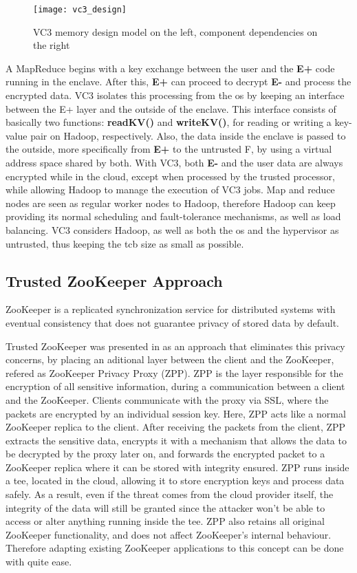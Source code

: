 \begin{figure}[tbp]
	\centering
	{\texttt{[image: vc3\_design]}}
	\caption{VC3 memory design model on the left, component dependencies on the right}
\end{figure}

A MapReduce begins with a key exchange between the user and the \textbf{E+} code running in the enclave. After this, \textbf{E+} can proceed to decrypt \textbf{E-} and process the encrypted data. VC3 isolates this processing from the \gls{os} by keeping an interface between the E+ layer and the outside of the enclave. This interface consists of basically two functions: \textbf{readKV()} and \textbf{writeKV()}, for reading or writing a key-value pair on Hadoop, respectively. Also, the data inside the enclave is passed to the outside, more specifically from \textbf{E+} to the untrusted F, by using a virtual address space shared by both.
With VC3, both \textbf{E-} and the user data are always encrypted while in the cloud, except when processed by the trusted processor, while allowing Hadoop to manage the execution of VC3 jobs. Map and reduce nodes are seen as regular worker nodes to Hadoop, therefore Hadoop can keep providing its normal scheduling and fault-tolerance mechanisms, as well as load balancing. VC3 considers Hadoop, as well as both the \gls{os} and the hypervisor as untrusted, thus keeping the \gls{tcb} size as small as possible.

\subsection{Trusted ZooKeeper Approach}
\label{ssec:protected_zookeeper}

ZooKeeper \cite{zookeeper} is a replicated synchronization service for distributed systems with eventual consistency that does not guarantee privacy of stored data by default. 

Trusted ZooKeeper was presented in \cite{protectedZooKeeper} as an approach that eliminates this privacy concerns, by placing an aditional layer between the client and the ZooKeeper, refered as ZooKeeper Privacy Proxy (ZPP). ZPP is the layer responsible for the encryption of all sensitive information, during a communication between a client and the ZooKeeper. 
Clients communicate with the proxy via SSL, where the packets are encrypted by an individual session key. Here, ZPP acts like a normal ZooKeeper replica to the client. 
After receiving the packets from the client, ZPP extracts the sensitive data, encrypts it with a mechanism that allows the data to be decrypted by the proxy later on, and forwards the encrypted packet to a ZooKeeper replica where it can be stored with integrity ensured.
ZPP runs inside a \gls{tee}, located in the cloud, allowing it to store encryption keys and process data safely. As a result, even if the threat comes from the cloud provider itself, the integrity of the data will still be granted since the attacker won't be able to access or alter anything running inside the \gls{tee}.
ZPP also retains all original ZooKeeper functionality, and does not affect ZooKeeper's internal behaviour. Therefore adapting existing ZooKeeper applications to this concept can be done with quite ease.

